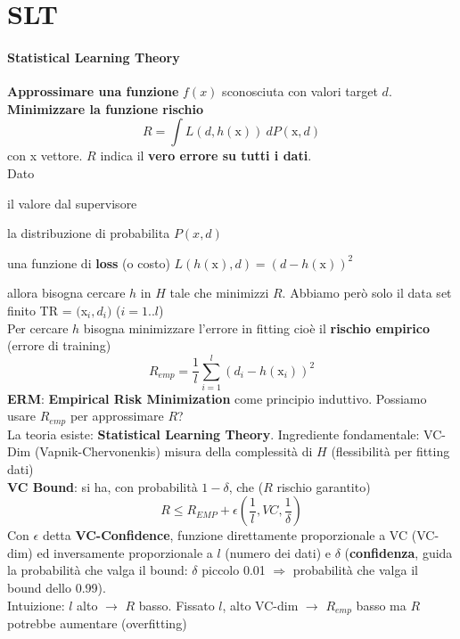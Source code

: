 \documentclass[10pt]{book}
\begin{document}
\section{SLT} \paragraph{Statistical Learning Theory} \textbf{Approssimare una funzione} $f(x)$ sconosciuta con valori target $d$. \textbf{Minimizzare la funzione rischio} $$R = \int L(d, h(\text{x}))\: dP(\text{x}, d)$$ con x vettore. $R$ indica il \textbf{vero errore su tutti i dati}.\\
Dato
\begin{list}{}{}
	\item il valore dal supervisore
	\item la distribuzione di probabilita $P(x,d)$
	\item una funzione di \textbf{loss} (o costo) $L(h(\text{x}), d) = (d - h(\text{x}))^2$
\end{list}
allora bisogna cercare $h$ in $H$ tale che minimizzi $R$. Abbiamo però solo il data set finito TR = $($x$_i, d_i)$ ($i = 1..l$)\\ Per cercare $h$ bisogna minimizzare l'errore in fitting cioè il \textbf{rischio empirico} (errore di training) $$R_{emp} = \frac{1}{l}\sum_{i = 1}^l \left(d_i - h(\text{x}_i)\right) ^2$$
\textbf{ERM}: \textbf{Empirical Risk Minimization} come principio induttivo. Possiamo usare $R_{emp}$ per approssimare $R$?\\
La teoria esiste: \textbf{Statistical Learning Theory}. Ingrediente fondamentale: VC-Dim (Vapnik-Chervonenkis) misura della complessità di $H$ (flessibilità per fitting dati)\\
\textbf{VC Bound}: si ha, con probabilità $1 -\delta$, che ($R$ rischio garantito)
$$R\leq R_{EMP} + \epsilon\left(\frac{1}{l}, VC, \frac{1}{\delta}\right)$$
Con $\epsilon$ detta \textbf{VC-Confidence}, funzione direttamente proporzionale a VC (VC-dim) ed inversamente proporzionale a $l$ (numero dei dati) e $\delta$ (\textbf{confidenza}, guida la probabilità che valga il bound: $\delta$ piccolo 0.01 $\Rightarrow$ probabilità che valga il bound dello 0.99).\\
Intuizione: $l$ alto $\rightarrow$ $R$ basso. Fissato $l$, alto VC-dim $\rightarrow$ $R_{emp}$ basso ma $R$ potrebbe aumentare (overfitting)
\end{document}
